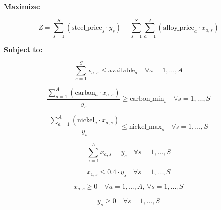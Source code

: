 \documentclass{article}
\begin{document}
\textbf{Maximize:}

\[
Z = \sum_{s=1}^{S} \left( \text{steel\_price}_s \cdot y_s \right) - \sum_{s=1}^{S} \sum_{a=1}^{A} \left( \text{alloy\_price}_a \cdot x_{a,s} \right)
\]

\textbf{Subject to:}

\[
\sum_{s=1}^{S} x_{a,s} \leq \text{available}_a \quad \forall a = 1, \ldots, A
\]

\[
\frac{\sum_{a=1}^{A} \left( \text{carbon}_a \cdot x_{a,s} \right)}{y_s} \geq \text{carbon\_min}_s \quad \forall s = 1, \ldots, S
\]

\[
\frac{\sum_{a=1}^{A} \left( \text{nickel}_a \cdot x_{a,s} \right)}{y_s} \leq \text{nickel\_max}_s \quad \forall s = 1, \ldots, S
\]

\[
\sum_{a=1}^{A} x_{a,s} = y_s \quad \forall s = 1, \ldots, S
\]

\[
x_{1,s} \leq 0.4 \cdot y_s \quad \forall s = 1, \ldots, S
\]

\[
x_{a,s} \geq 0 \quad \forall a = 1, \ldots, A, \, \forall s = 1, \ldots, S
\]

\[
y_s \geq 0 \quad \forall s = 1, \ldots, S
\]
\end{document}
